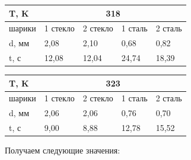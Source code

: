 \documentclass[a4paper,12pt]{article} %
\begin{document}
\begin{table}[h!]
\begin{tabular}{|l|llll|}
\hline
T,  K  & \multicolumn{4}{c|}{318}                                                                               \\ \hline
шарики & \multicolumn{1}{l|}{1 стекло} & \multicolumn{1}{l|}{2 стекло} & \multicolumn{1}{l|}{1 сталь} & 2 сталь \\ \hline
d, мм  & \multicolumn{1}{l|}{2,08}     & \multicolumn{1}{l|}{2,10}     & \multicolumn{1}{l|}{0,68}    & 0,82    \\ \hline
t, с   & \multicolumn{1}{l|}{12,08}    & \multicolumn{1}{l|}{12,04}    & \multicolumn{1}{l|}{24,74}   & 18,39   \\ \hline
\end{tabular}
\end{table}



\begin{table}[h!]
\begin{tabular}{|l|llll|}
\hline
T,  K  & \multicolumn{4}{c|}{323}                                                                               \\ \hline
шарики & \multicolumn{1}{l|}{1 стекло} & \multicolumn{1}{l|}{2 стекло} & \multicolumn{1}{l|}{1 сталь} & 2 сталь \\ \hline
d, мм  & \multicolumn{1}{l|}{2,06}     & \multicolumn{1}{l|}{2,06}     & \multicolumn{1}{l|}{0,76}    & 0,70    \\ \hline
t, с   & \multicolumn{1}{l|}{9,00}     & \multicolumn{1}{l|}{8,88}     & \multicolumn{1}{l|}{12,78}   & 15,52   \\ \hline
\end{tabular}
\end{table}

\noindent Получаем следующие значения:
\end{document}
